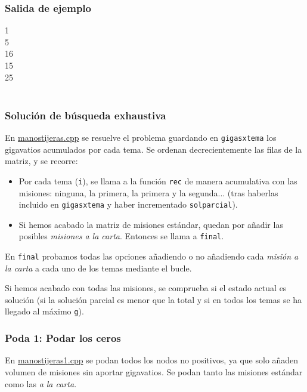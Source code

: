 \documentclass{article}
\newenvironment{caja}{
	\begingroup
	\ttfamily\noindent
	\tabularx{\linewidth}{|X|}\hline
}
{
	\hline\endtabularx
	\normalfont
	\endgroup
}
\begin{document}
	\subsubsection*{Salida de ejemplo}
	\begin{caja}
		1\\
		5\\
		16\\
		15\\
		25\\
	\end{caja}\\

	\newpage
	
	\subsubsection*{Solución de búsqueda exhaustiva}
	En \href{run:manostijeras.cpp}{manostijeras.cpp} se resuelve el problema guardando en \texttt{gigasxtema} los gigavatios acumulados por cada tema. Se ordenan decrecientemente las filas de la matriz, y se recorre:
	\begin{itemize}
		\item Por cada tema (\texttt{i}), se llama a la función \texttt{rec} de manera acumulativa con las misiones: ninguna, la primera, la primera y la segunda... (tras haberlas incluido en \texttt{gigasxtema} y haber incrementado \texttt{solparcial}).
		\item Si hemos acabado la matriz de misiones estándar, quedan por añadir las posibles \textit{misiones a la carta}. Entonces se llama a \texttt{final}.
	\end{itemize}

	En \texttt{final} probamos todas las opciones añadiendo o no añadiendo cada \textit{misión a la carta} a cada uno de los temas mediante el bucle.
	
	Si hemos acabado con todas las misiones, se comprueba si el estado actual es solución (si la solución parcial es menor que la total y si en todos los temas se ha llegado al máximo \texttt{g}).\\
	
	\subsubsection*{Poda 1: Podar los ceros}
	En \href{run:manostijeras1.cpp}{manostijeras1.cpp} se podan todos los nodos no positivos, ya que solo añaden volumen de misiones sin aportar gigavatios. Se podan tanto las misiones estándar como las \textit{a la carta}.\\
	
\end{document}
